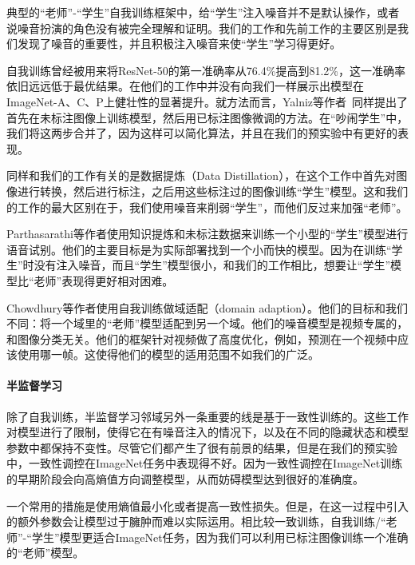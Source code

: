 \documentclass[10pt]{article}
\begin{document}
典型的“老师”-“学生”自我训练框架中，给“学生”注入噪音并不是默认操作，或者说噪音扮演的角色没有被完全理解和证明。我们的工作和先前工作的主要区别是我们发现了噪音的重要性，并且积极注入噪音来使“学生”学习得更好。  


自我训练曾经被用来将ResNet-50的第一准确率从76.4\%提高到81.2\%\cite{billion_large_scale}，这一准确率依旧远远低于最优结果。在他们的工作中并没有向我们一样展示出模型在ImageNet-A、C、P上健壮性的显著提升。就方法而言，Yalniz等作者~\cite{billion_large_scale}同样提出了首先在未标注图像上训练模型，然后用已标注图像微调的方法。在“吵闹学生”中，我们将这两步合并了，因为这样可以简化算法，并且在我们的预实验中有更好的表现。  


同样和我们的工作有关的是数据提炼（Data Distillation）\cite{radosavovic2018data}，在这个工作中首先对图像进行转换，然后进行标注，之后用这些标注过的图像训练“学生”模型。这和我们的工作的最大区别在于，我们使用噪音来削弱“学生”，而他们反过来加强“老师”。  


Parthasarathi等作者\cite{parthasarathi2019lessons}使用知识提炼和未标注数据来训练一个小型的“学生”模型进行语音试别。他们的主要目标是为实际部署找到一个小而快的模型。因为在训练“学生”时没有注入噪音，而且“学生”模型很小，和我们的工作相比，想要让“学生”模型比“老师”表现得更好相对困难。  


Chowdhury等作者\cite{Chowdhury19}使用自我训练做域适配（domain adaption）。他们的目标和我们不同：将一个域里的“老师”模型适配到另一个域。他们的噪音模型是视频专属的，和图像分类无关。他们的框架针对视频做了高度优化，例如，预测在一个视频中应该使用哪一帧。这使得他们的模型的适用范围不如我们的广泛。  

\paragraph{半监督学习}

除了自我训练，半监督学习邻域另外一条重要的线是基于一致性训练的\cite{blum1998combining,bachman2014learning,rasmus2015semi,laine2016temporal,tarvainen2017mean,miyato2018virtual,luo2018smooth,qiao2018deep,chen2018semi,clark2018semi,park2018adversarial,athiwaratkun2018there,li2019certainty,verma2019interpolation,uda,mixmatch,zhai2019s}。这些工作对模型进行了限制，使得它在有噪音注入的情况下，以及在不同的隐藏状态和模型参数中都保持不变性。尽管它们都产生了很有前景的结果，但是在我们的预实验中，一致性调控在ImageNet任务中表现得不好。因为一致性调控在ImageNet训练的早期阶段会向高熵值方向调整模型，从而妨碍模型达到很好的准确度。  

一个常用的措施是使用熵值最小化或者提高一致性损失。但是，在这一过程中引入的额外参数会让模型过于臃肿而难以实际运用。相比较一致训练\cite{miyato2018virtual,mixmatch,uda}，自我训练/“老师”-“学生”模型更适合ImageNet任务，因为我们可以利用已标注图像训练一个准确的“老师”模型。  
\end{document}
